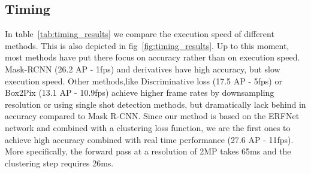 \subsection{Timing}
In table~\ref{tab:timing_results} we compare the execution speed of different methods. This is also depicted in fig~\ref{fig:timing_results}. Up to this moment, most methods have put there focus on accuracy rather than on execution speed. Mask-RCNN (26.2 AP - 1fps) and derivatives have high accuracy, but slow execution speed. Other methods,like Discriminative loss (17.5 AP - 5fps) or Box2Pix (13.1 AP - 10.9fps) achieve higher frame rates by downsampling resolution or using single shot detection methods, but dramatically lack behind in accuracy compared to Mask R-CNN. Since our method is based on the ERFNet network and combined with a clustering loss function, we are the first ones to achieve high accuracy  combined with real time performance (27.6 AP - 11fps). More specifically, the forward pass at a resolution of 2MP takes 65ms and the clustering step requires 26ms. 


